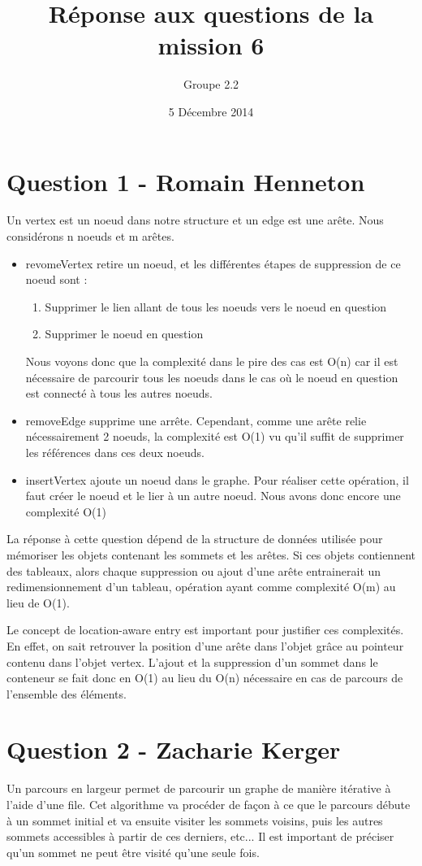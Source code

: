 \documentclass[10pt,a4paper]{article}
\date{5 Décembre 2014}
\author{Groupe 2.2}
\title{Réponse aux questions de la mission 6}
\begin{document}
\maketitle

\section*{Question 1 - Romain Henneton}
Un vertex est un noeud dans notre structure et un edge est une arête. Nous considérons n noeuds et m arêtes.
\begin{itemize}
\item revomeVertex retire un noeud, et les différentes étapes de suppression de ce noeud sont :
\begin{enumerate}
\item Supprimer le lien allant de tous les noeuds vers le noeud en question
\item Supprimer le noeud en question
\end{enumerate}
Nous voyons donc que la complexité dans le pire des cas est O(n) car il est nécessaire de parcourir tous les noeuds dans le cas où le noeud en question est connecté à tous les autres noeuds.
\item removeEdge supprime une arrête. Cependant, comme une arête relie nécessairement 2 noeuds, la complexité est O(1) vu qu'il suffit de supprimer les références dans ces deux noeuds.
\item insertVertex ajoute un noeud dans le graphe. Pour réaliser cette opération, il faut créer le noeud et le lier à un autre noeud. Nous avons donc encore une complexité O(1)
\end{itemize}

La réponse à cette question dépend de la structure de données utilisée pour mémoriser les objets contenant les sommets et les arêtes. Si ces objets contiennent des tableaux, alors chaque suppression ou ajout d'une arête entrainerait un redimensionnement d'un tableau, opération ayant comme complexité O(m) au lieu de O(1).

Le concept de location-aware entry est important pour justifier ces complexités. En effet, on sait retrouver la position d'une arête dans l'objet grâce au pointeur contenu dans l'objet vertex. L'ajout et la suppression d'un sommet dans le conteneur se fait donc en O(1) au lieu du O(n) nécessaire en cas de parcours de l'ensemble des éléments.
\section*{Question 2 - Zacharie Kerger}
Un parcours en largeur permet de parcourir un graphe de manière itérative à l'aide d'une file. Cet algorithme va procéder de façon à ce que le parcours débute à un sommet initial et va ensuite visiter les sommets voisins, puis les autres sommets accessibles à partir de ces derniers, etc... Il est important de préciser qu'un sommet ne peut être visité qu'une seule fois.\\
\end{document}
